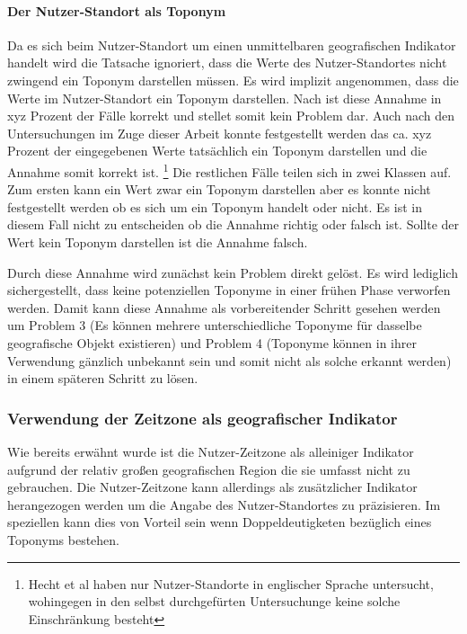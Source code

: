 					\paragraph{Der Nutzer-Standort als Toponym} 
						Da es sich beim Nutzer-Standort um einen unmittelbaren geografischen Indikator handelt wird die Tatsache ignoriert, dass die Werte des Nutzer-Standortes nicht zwingend ein Toponym darstellen müssen. 
						Es wird implizit angenommen, dass die Werte im Nutzer-Standort ein Toponym darstellen.
						Nach \cite{Hecht2011} ist diese Annahme in xyz Prozent der Fälle korrekt und stellet somit kein Problem dar. 
						Auch nach den Untersuchungen im Zuge dieser Arbeit konnte festgestellt werden das ca. xyz Prozent der eingegebenen Werte tatsächlich ein Toponym darstellen und die Annahme somit korrekt ist. \footnote{
						Hecht et al haben nur Nutzer-Standorte in englischer Sprache untersucht, wohingegen in den selbst durchgefürten Untersuchunge keine solche Einschränkung besteht} 
						Die restlichen Fälle teilen sich in zwei Klassen auf. 
						Zum ersten kann ein Wert zwar ein Toponym darstellen aber es konnte nicht festgestellt werden ob es sich um ein Toponym handelt oder nicht.
						Es ist in diesem Fall nicht zu entscheiden ob die Annahme richtig oder falsch ist. 
						Sollte der Wert kein Toponym darstellen ist die Annahme falsch.

						Durch diese Annahme wird zunächst kein Problem direkt gelöst. 
						Es wird lediglich sichergestellt, dass keine potenziellen Toponyme in einer frühen Phase verworfen werden. 
						Damit kann diese Annahme als vorbereitender Schritt gesehen werden um Problem 3 (Es können mehrere unterschiedliche Toponyme für dasselbe geografische Objekt existieren) und Problem 4 (Toponyme können in ihrer Verwendung gänzlich unbekannt sein und somit nicht als solche erkannt werden) in einem späteren Schritt zu lösen. 


					\subsubsection{Verwendung der Zeitzone als geografischer Indikator}

						Wie bereits erwähnt wurde ist die Nutzer-Zeitzone als alleiniger Indikator aufgrund der relativ großen geografischen Region die sie umfasst nicht zu gebrauchen. 
						Die Nutzer-Zeitzone kann allerdings als zusätzlicher Indikator herangezogen werden um die Angabe des Nutzer-Standortes zu präzisieren.	
						Im speziellen kann dies von Vorteil sein wenn Doppeldeutigketen bezüglich eines Toponyms bestehen. 

